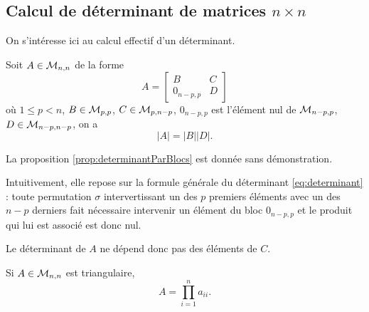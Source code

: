 \subsection{Calcul de déterminant de matrices $n \times n$} 

On s'intéresse ici au calcul effectif d'un déterminant.

\begin{proposition} \label{prop:determinantParBlocs}
  Soit $A \in \mathcal{M}_{n,n}$ de la forme
  $$
  A = \left[\begin{array}{cc}
      B & C \\ 0_{n-p, p} & D
    \end{array}\right]
  $$
  où $1 \leq p < n$, $B \in \mathcal{M}_{p, p}$, $C \in \mathcal{M}_{p, n-p}$, $0_{n-p, p}$ est l'élément nul de $\mathcal{M}_{n-p, p}$, $D \in \mathcal{M}_{n-p, n-p}$, on a
  $$
  |A| = |B| |D|.
  $$
\end{proposition}

\proof
La proposition \ref{prop:determinantParBlocs} est donnée sans démonstration. 
\eproof

\remark 
Intuitivement, elle repose sur la formule générale du déterminant \eqref{eq:determinant} : toute permutation $\sigma$ intervertissant un des $p$ premiers éléments avec un des $n-p$ derniers fait nécessaire intervenir un élément du bloc $0_{n-p, p}$ et le produit qui lui est associé est donc nul.

\remark Le déterminant de $A$ ne dépend donc pas des éléments de $C$.

\begin{proposition} \label{prop:determinantMatriceTriangulaire}
  Si $A \in \mathcal{M}_{n,n}$ est triangulaire, 
  $$
  A = \prod_{i=1}^n a_{ii}.
  $$
\end{proposition}

